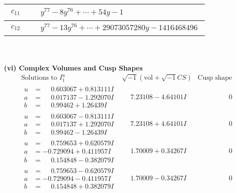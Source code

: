\documentclass[1p]{elsarticle_modified}
\theoremstyle{definition}
\newcommand{\I}{\sqrt{-1}}
\begin{document}
\begin{tabular}{m{50pt}|m{274pt}}
\hline $$\begin{aligned}c_{11}\end{aligned}$$&$\begin{aligned}
&y^{77}-8 y^{76}+\cdots+54 y-1
\end{aligned}$\\
\hline $$\begin{aligned}c_{12}\end{aligned}$$&$\begin{aligned}
&y^{77}-13 y^{76}+\cdots+29073057280 y-1416468496
\end{aligned}$\\
\hline
\end{tabular}\\~\\
\newpage\flushleft \textbf{(vi) Complex Volumes and Cusp Shapes}
$$\begin{array}{c|c|c}  
\text{Solutions to }I^u_{1}& \I (\text{vol} + \sqrt{-1}CS) & \text{Cusp shape}\\
 \hline 
\begin{aligned}
u &= \phantom{-}0.603067 + 0.813111 I \\
a &= \phantom{-}0.017137 - 1.292070 I \\
b &= \phantom{-}0.99462 + 1.26439 I\end{aligned}
 & \phantom{-}7.23108 - 4.64101 I & \phantom{-0.000000 } 0 \\ \hline\begin{aligned}
u &= \phantom{-}0.603067 - 0.813111 I \\
a &= \phantom{-}0.017137 + 1.292070 I \\
b &= \phantom{-}0.99462 - 1.26439 I\end{aligned}
 & \phantom{-}7.23108 + 4.64101 I & \phantom{-0.000000 } 0 \\ \hline\begin{aligned}
u &= \phantom{-}0.759653 + 0.620579 I \\
a &= -0.729094 + 0.411957 I \\
b &= \phantom{-}0.154848 - 0.382079 I\end{aligned}
 & \phantom{-}1.70009 + 0.34267 I & \phantom{-0.000000 } 0 \\ \hline\begin{aligned}
u &= \phantom{-}0.759653 - 0.620579 I \\
a &= -0.729094 - 0.411957 I \\
b &= \phantom{-}0.154848 + 0.382079 I\end{aligned}
 & \phantom{-}1.70009 - 0.34267 I & \phantom{-0.000000 } 0 \\ \hline\begin{aligned}

\end{aligned}
\end{array}$$
\end{document}
